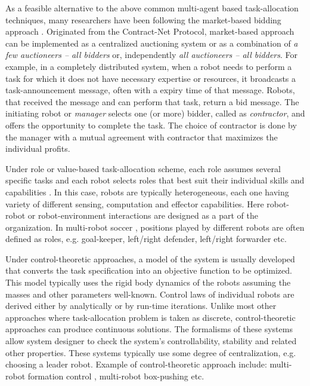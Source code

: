 \documentclass[preprint,12pt]{elsarticle}
\begin{document}
As a feasible alternative to the above common multi-agent based task-allocation techniques, many researchers have been following the market-based bidding approach \citet{Dias+2006}. Originated from the Contract-Net Protocol, market-based approach can be implemented as a centralized auctioning system or as a combination of {\em a few auctioneers -- all bidders} or, independently {\em all auctioneers -- all bidders}. For example, in a completely distributed system, when a robot needs to perform a task for which it does not have necessary expertise or resources, it broadcasts a task-announcement message, often with  a expiry time of that message. Robots, that received the message and can perform that task, return a bid message. The initiating robot or {\em  manager} selects one (or more) bidder, called as {\em contractor}, and offers the opportunity to complete the task. The choice of contractor is done by the manager with a mutual agreement with contractor that maximizes the individual profits.

Under role or value-based task-allocation scheme, each role assumes several specific tasks and each robot selects roles that best suit their individual skills and capabilities \cite{Chaimowicz2002}. In this case, robots are typically heterogeneous, each one having variety of different sensing, computation and effector capabilities. Here robot-robot or robot-environment interactions are designed as a part of the organization. In multi-robot soccer \cite{Stone+1999}, positions played by different  robots are often defined as roles, e.g. goal-keeper, left/right defender, left/right forwarder etc. 

Under control-theoretic approaches, a model of the system is usually developed that converts the task specification into an objective function to be optimized. This model typically  uses  the rigid  body dynamics of the robots assuming the masses and other parameters well-known. Control laws of individual robots are derived either by analytically or by run-time iterations. Unlike most other approaches where task-allocation problem is taken as discrete, control-theoretic approaches can produce continuous  solutions. The formalisms of these systems allow system designer to check the system's controllability, stability and related other properties.  These systems typically use some degree of centralization, e.g. choosing a leader robot.  Example of control-theoretic approach include: multi-robot formation control \cite{Belta+2004}, multi-robot box-pushing \cite{Pereira+2003}  etc.
\end{document}
